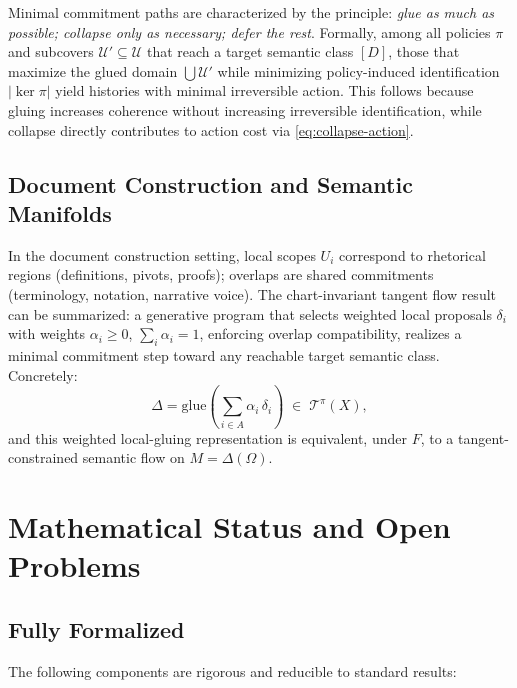 \documentclass[12pt, a4paper]{article}
\theoremstyle{definition}
\theoremstyle{remark}
\begin{document}
Minimal commitment paths are characterized by the principle: \emph{glue as much as
possible; collapse only as necessary; defer the rest}. Formally, among all policies
$\pi$ and subcovers $\mathcal{U}' \subseteq \mathcal{U}$ that reach a target
semantic class $[D]$, those that maximize the glued domain $\bigcup \mathcal{U}'$
while minimizing policy-induced identification $|\ker\pi|$ yield histories with minimal
irreversible action. This follows because gluing increases coherence without increasing
irreversible identification, while collapse directly contributes to action cost via
\eqref{eq:collapse-action}.

\subsection{Document Construction and Semantic Manifolds}

In the document construction setting, local scopes $U_i$
correspond to rhetorical regions (definitions, pivots, proofs); overlaps are shared
commitments (terminology, notation, narrative voice). The chart-invariant tangent flow
result can be summarized: a generative program
that selects weighted local proposals $\delta_i$ with weights $\alpha_i \ge 0$,
$\sum_i \alpha_i = 1$, enforcing overlap compatibility, realizes a minimal commitment
step toward any reachable target semantic class. Concretely:
\[
  \Delta = \mathrm{glue}\!\left(\sum_{i \in A} \alpha_i\,\delta_i\right)
  \;\in\; \mathcal{T}^\pi(X),
\]
and this weighted local-gluing representation is equivalent, under $F$, to a
tangent-constrained semantic flow on $M = \Delta(\Omega)$.

\section{Mathematical Status and Open Problems}
\label{sec:status}

\subsection{Fully Formalized}

The following components are rigorous and reducible to standard results:
\end{document}
